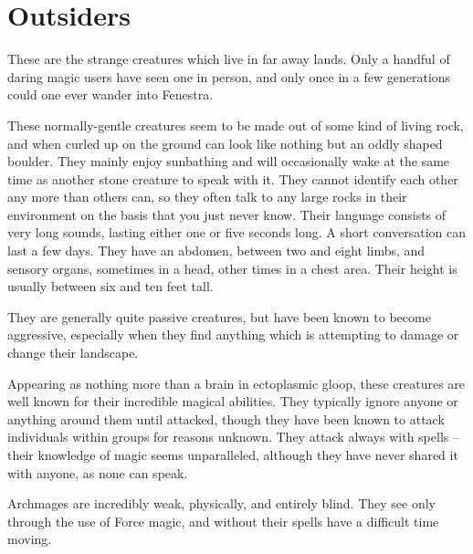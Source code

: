 \section{Outsiders}

\begin{multicols}{2}

\noindent
These are the strange creatures which live in far away lands.  Only a handful of daring magic users have seen one in person, and only once in a few generations could one ever wander into Fenestra.

\label{rockman}

These normally-gentle creatures seem to be made out of some kind of living rock, and when curled up on the ground can look like nothing but an oddly shaped boulder.
They mainly enjoy sunbathing and will occasionally wake at the same time as another stone creature to speak with it.
They cannot identify each other any more than others can, so they often talk to any large rocks in their environment on the basis that you just never know.
Their language consists of very long sounds, lasting either one or five seconds long.
A short conversation can last a few days.
They have an abdomen, between two and eight limbs, and sensory organs, sometimes in a head, other times in a chest area.
Their height is usually between six and ten feet tall.

They are generally quite passive creatures, but have been known to become aggressive, especially when they find anything which is attempting to damage or change their landscape.

\rockman

\label{archmage}

Appearing as nothing more than a brain in ectoplasmic gloop, these creatures are well known for their incredible magical abilities.
They typically ignore anyone or anything around them until attacked, though they have been known to attack individuals within groups for reasons unknown.
They attack always with spells -- their knowledge of magic seems unparalleled, although they have never shared it with anyone, as none can speak.

Archmages are incredibly weak, physically, and entirely blind.
They see only through the use of Force magic, and without their spells have a difficult time moving.

\archmage


\end{multicols}
